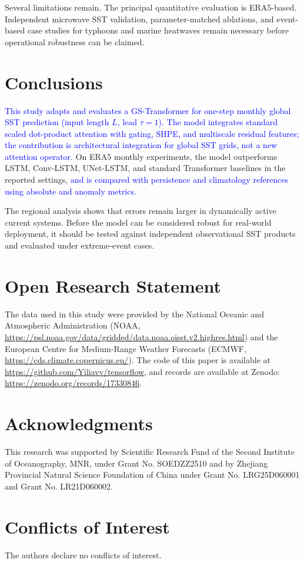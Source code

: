 \documentclass[published]{agujournal2025}
\newcommand{\rev}[1]{\textcolor{blue}{#1}}
\begin{document}
Several limitations remain. The principal quantitative evaluation is ERA5-based. Independent microwave SST validation, parameter-matched ablations, and event-based case studies for typhoons and marine heatwaves remain necessary before operational robustness can be claimed\cite{cui2023predicting,cai2021changing}.

\section{Conclusions}
\rev{This study adapts and evaluates a GS-Transformer for one-step monthly global SST prediction (input length $L$, lead $\tau=1$). The model integrates standard scaled dot-product attention with gating, SHPE, and multiscale residual features; the contribution is architectural integration for global SST grids, not a new attention operator.} On ERA5 monthly experiments, the model outperforms LSTM, Conv-LSTM, UNet-LSTM, and standard Transformer baselines in the reported settings, \rev{and is compared with persistence and climatology references using absolute and anomaly metrics.}

The regional analysis shows that errors remain larger in dynamically active current systems. Before the model can be considered robust for real-world deployment, it should be tested against independent observational SST products and evaluated under extreme-event cases.

\section*{Open Research Statement}
\begin{sloppypar}
The data used in this study were provided by the National Oceanic and Atmospheric Administration (NOAA, \url{https://psl.noaa.gov/data/gridded/data.noaa.oisst.v2.highres.html}) and the European Centre for Medium-Range Weather Forecasts (ECMWF, \url{https://cds.climate.copernicus.eu/}). The code of this paper is available at \url{https://github.com/Yiliavv/tensorflow}, and records are available at Zenodo: \url{https://zenodo.org/records/17330846}.
\end{sloppypar}

\section*{Acknowledgments}
This research was supported by Scientific Research Fund of the Second Institute of Oceanography, MNR, under Grant No. SOEDZZ2510 and by Zhejiang Provincial Natural Science Foundation of China under Grant No. LRG25D060001 and Grant No. LR21D060002.

\section*{Conflicts of Interest}
The authors declare no conflicts of interest.


\end{document}
